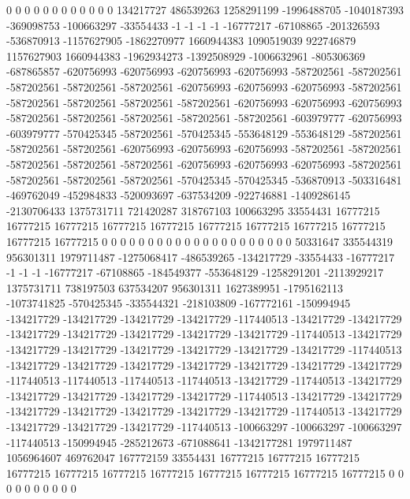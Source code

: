 0 0 0 0 0 0 0 0 0 0 0 0 134217727 486539263 1258291199 -1996488705 -1040187393 -369098753 -100663297 -33554433 -1 -1 -1 -1 -16777217 -67108865 -201326593 -536870913 -1157627905 -1862270977 1660944383 1090519039 922746879 1157627903 1660944383 -1962934273 -1392508929 -1006632961 -805306369 -687865857 -620756993 -620756993 -620756993 -620756993 -587202561 -587202561 -587202561 -587202561 -587202561 -620756993 -620756993 -620756993 -587202561 -587202561 -587202561 -587202561 -587202561 -620756993 -620756993 -620756993 -587202561 -587202561 -587202561 -587202561 -587202561 -603979777 -620756993 -603979777 -570425345 -587202561 -570425345 -553648129 -553648129 -587202561 -587202561 -587202561 -620756993 -620756993 -620756993 -587202561 -587202561 -587202561 -587202561 -587202561 -620756993 -620756993 -620756993 -587202561 -587202561 -587202561 -587202561 -570425345 -570425345 -536870913 -503316481 -469762049 -452984833 -520093697 -637534209 -922746881 -1409286145 -2130706433 1375731711 721420287 318767103 100663295 33554431 16777215 16777215 16777215 16777215 16777215 16777215 16777215 16777215 16777215 16777215 16777215 0 0 0 0 0 0 0 0 0 0
0 0 0 0 0 0 0 0 0 0 0 50331647 335544319 956301311 1979711487 -1275068417 -486539265 -134217729 -33554433 -16777217 -1 -1 -1 -16777217 -67108865 -184549377 -553648129 -1258291201 -2113929217 1375731711 738197503 637534207 956301311 1627389951 -1795162113 -1073741825 -570425345 -335544321 -218103809 -167772161 -150994945 -134217729 -134217729 -134217729 -134217729 -117440513 -134217729 -134217729 -134217729 -134217729 -134217729 -134217729 -134217729 -117440513 -134217729 -134217729 -134217729 -134217729 -134217729 -134217729 -134217729 -117440513 -134217729 -134217729 -134217729 -134217729 -134217729 -134217729 -134217729 -117440513 -117440513 -117440513 -117440513 -134217729 -117440513 -134217729 -134217729 -134217729 -134217729 -134217729 -117440513 -134217729 -134217729 -134217729 -134217729 -134217729 -134217729 -134217729 -117440513 -134217729 -134217729 -134217729 -134217729 -117440513 -100663297 -100663297 -100663297 -117440513 -150994945 -285212673 -671088641 -1342177281 1979711487 1056964607 469762047 167772159 33554431 16777215 16777215 16777215 16777215 16777215 16777215 16777215 16777215 16777215 16777215 16777215 0 0 0 0 0 0 0 0 0 0
